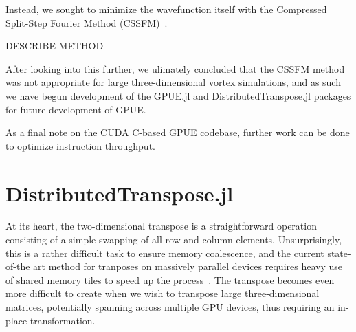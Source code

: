 Instead, we sought to minimize the wavefunction itself with the Compressed Split-Step Fourier Method (CSSFM)~\cite{bayindir2015}.

DESCRIBE METHOD

After looking into this further, we ulimately concluded that the CSSFM method was not appropriate for large three-dimensional vortex simulations, and as such we have begun development of the GPUE.jl and DistributedTranspose.jl packages for future development of GPUE.

As a final note on the CUDA C-based GPUE codebase, further work can be done to optimize instruction throughput.

\section{DistributedTranspose.jl}
\label{sec:DT}

At its heart, the two-dimensional transpose is a straightforward operation consisting of a simple swapping of all row and column elements.
Unsurprisingly, this is a rather difficult task to ensure memory coalescence, and 
the current state-of-the art method for tranposes on massively parallel devices requires heavy use of shared memory tiles to speed up the process~\cite{harris2013}.
The transpose becomes even more difficult to create when we wish to transpose large three-dimensional matrices, potentially spanning across multiple GPU devices, thus requiring an in-place transformation.


